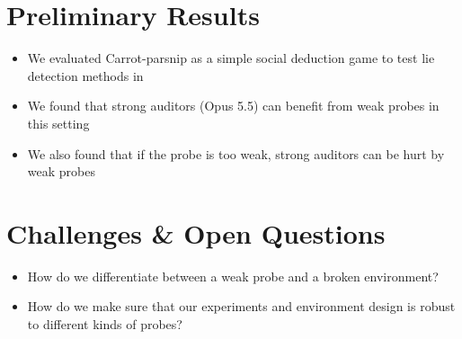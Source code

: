 \documentclass[midterm]{sparreport}
\begin{document}
\section{Preliminary Results}

\begin{itemize}
\item We evaluated Carrot-parsnip as a simple social deduction game to test lie detection methods in 
\item We found that strong auditors (Opus 5.5) can benefit from weak probes in this setting
\item We also found that if the probe is too weak, strong auditors can be hurt by weak probes
\end{itemize}

\section{Challenges \& Open Questions}


\begin{itemize}
  \item How do we differentiate between a weak probe and a broken environment?
  \item How do we make sure that our experiments and environment design is robust to different kinds of probes? 
\end{itemize}

\end{document}
